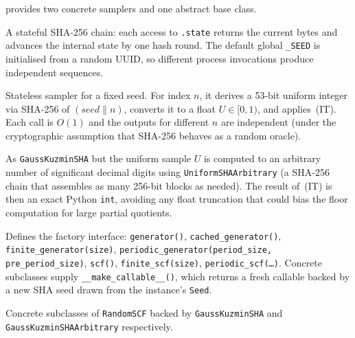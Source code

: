 \catena provides two concrete samplers and one abstract base class.

\begin{description}[leftmargin=2em, style=nextline]
  \item[\texttt{Seed}]
    A stateful SHA-256 chain: each access to \texttt{.state} returns the
    current bytes and advances the internal state by one hash round.
    The default global \texttt{\_SEED} is initialised from a random UUID,
    so different process invocations produce independent sequences.

  \item[\texttt{GaussKuzminSHA}]
    Stateless sampler for a fixed seed.  For index $n$, it derives a
    53-bit uniform integer via SHA-256 of $(\textit{seed} \| n)$, converts
    it to a float $U \in [0,1)$, and applies~(IT).  Each call is $O(1)$
    and the outputs for different $n$ are independent (under the
    cryptographic assumption that SHA-256 behaves as a random oracle).

  \item[\texttt{GaussKuzminSHAArbitrary}]
    As \texttt{GaussKuzminSHA} but the uniform sample $U$ is computed to
    an arbitrary number of significant decimal digits using
    \texttt{UniformSHAArbitrary} (a SHA-256 chain that assembles as many
    256-bit blocks as needed).  The result of~(IT) is then an exact Python
    \texttt{int}, avoiding any float truncation that could bias the floor
    computation for large partial quotients.

  \item[\texttt{RandomSCF} (abstract base class)]
    Defines the factory interface: \texttt{generator()},
    \texttt{cached\_generator()}, \texttt{finite\_generator(size)},
    \texttt{periodic\_generator(period\_size, pre\_period\_size)},
    \texttt{scf()}, \texttt{finite\_scf(size)}, \texttt{periodic\_scf(\ldots)}.
    Concrete subclasses supply \texttt{\_\_make\_callable\_\_()}, which
    returns a fresh callable backed by a new SHA seed drawn from the
    instance's \texttt{Seed}.

  \item[\texttt{GaussKuzminSCF}, \texttt{GaussKuzminArbitrarySCF}]
    Concrete subclasses of \texttt{RandomSCF} backed by
    \texttt{GaussKuzminSHA} and \texttt{GaussKuzminSHAArbitrary}
    respectively.
\end{description}


